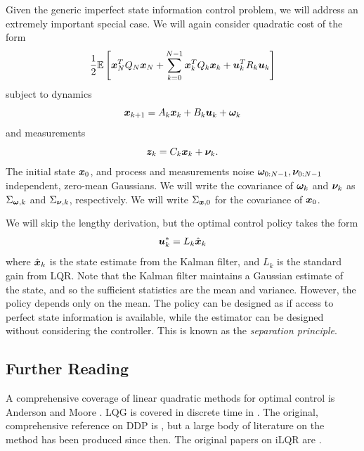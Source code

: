Given the generic imperfect state information control problem, we will address an extremely important special case. We will again consider quadratic cost of the form
\begin{equation}
    \frac{1}{2} \mathbb{E}\left[ \bm{x}_N^T Q_N \bm{x}_N + \sum_{k=0}^{N-1} \bm{x}_k^T Q_k \bm{x}_k + \bm{u}_k^T R_k \bm{u}_k \right]
\end{equation}
subject to dynamics
\begin{equation}
    \bm{x}_{k+1} = A_k \bm{x}_k + B_k \bm{u}_k + \bm{\omega}_{k}
\end{equation}
and measurements
\begin{equation}
    \bm{z}_k = C_k \bm{x}_k + \bm{\nu}_k.
\end{equation}
The initial state $\bm{x}_0$, and process and measurements noise $\bm{\omega}_{0:N-1},\bm{\nu}_{0:N-1}$ independent, zero-mean Gaussians. We will write the covariance of $\bm{\omega}_k$ and $\bm{\nu}_k$ as $\Sigma_{\bm{\omega},k}$ and $\Sigma_{\bm{\nu},k}$, respectively. We will write $\Sigma_{\bm{x},0}$ for the covariance of $\bm{x}_0$.

We will skip the lengthy derivation, but the optimal control policy takes the form
\begin{equation}
    \bm{u}_k^* = L_k \hat{\bm{x}}_k
\end{equation}
where $\hat{\bm{x}}_k$ is the state estimate from the Kalman filter, and $L_k$ is the standard gain from LQR. Note that the Kalman filter maintains a Gaussian estimate of the state, and so the sufficient statistics are the mean and variance. However, the policy depends only on the mean. The policy can be designed as if access to perfect state information is available, while the estimator can be designed without considering the controller. This is known as the \textit{separation principle}.


\subsection{Further Reading}

A comprehensive coverage of linear quadratic methods for optimal control is Anderson and Moore \cite{anderson2007optimal}. LQG is covered in discrete time in \cite{bertsekas1995dynamic}. The original, comprehensive reference on DDP is \cite{mayne1970ddp}, but a large body of literature on the method has been produced since then. The original papers on iLQR are \cite{todorov2005generalized,li2004iterative}.

